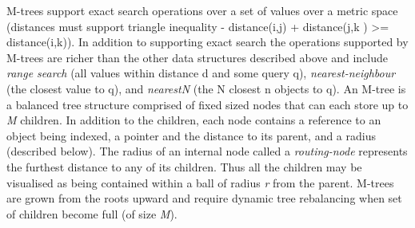 \documentclass{llncs}
\begin{document}
M-trees support exact search operations over a set of values over a metric space (distances must support triangle inequality -
distance(i,j) + distance(j,k ) >= distance(i,k)).
%
In addition to supporting exact search the operations supported by M-trees are richer than the other data structures described above and include \textit{range search} (all values within distance d and some query q),
\textit{nearest-neighbour} (the closest value to q), and \textit{nearestN} (the N closest n objects to q).
An M-tree is a balanced tree structure comprised of fixed sized nodes that can each store up to \textit{M} children.
In addition to the children, each node contains a reference to an object being indexed, a pointer and the distance to its parent, and a radius (described below). The radius of an internal node called a \textit{routing-node} represents the  furthest distance to any of its children. Thus all the children may be visualised as being contained within a ball of radius \textit{r} from the parent. M-trees are grown from the roots upward and require dynamic tree rebalancing when set of children become full (of size \textit{M}).






\end{document}

